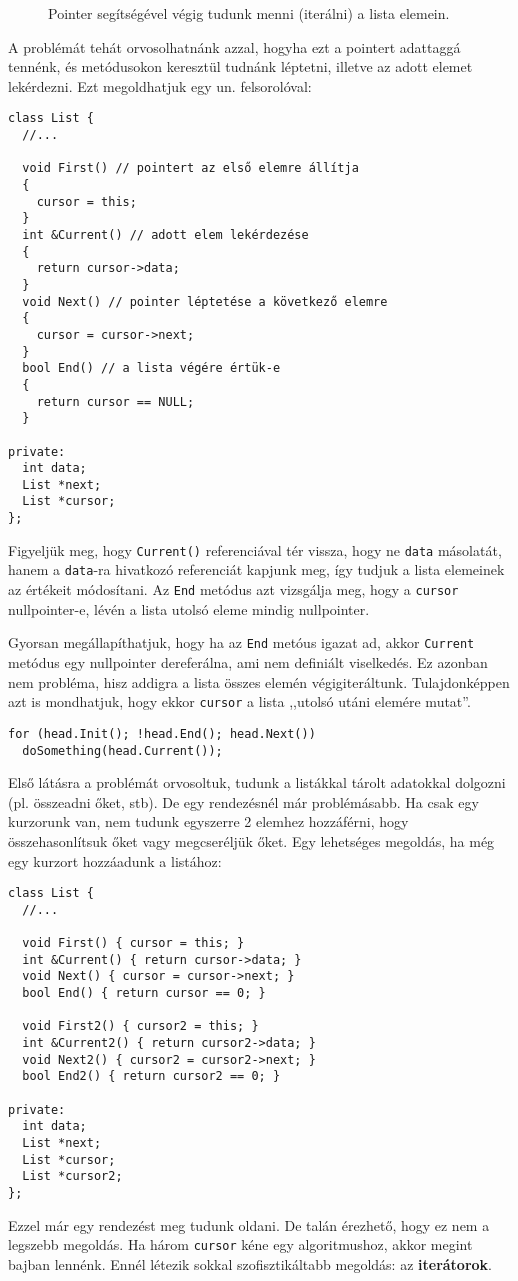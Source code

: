 \documentclass[../cpp_book/cpp_book.tex]{subfiles}
\begin{document}
	\begin{figure}[h]
		\centering
		
		
		\caption{Pointer segítségével végig tudunk menni (iterálni) a lista elemein.}
	\end{figure}
	A problémát tehát orvosolhatnánk azzal, hogyha ezt a pointert adattaggá tennénk, és metódusokon keresztül tudnánk léptetni, illetve az adott elemet lekérdezni. Ezt megoldhatjuk egy un. felsorolóval:
\begin{lstlisting}
class List {
  //...

  void First() // pointert az első elemre állítja
  {
    cursor = this;
  }
  int &Current() // adott elem lekérdezése
  {
    return cursor->data;
  }
  void Next() // pointer léptetése a következő elemre
  {
    cursor = cursor->next;
  }
  bool End() // a lista végére értük-e
  {
    return cursor == NULL;
  }

private:
  int data;
  List *next;
  List *cursor;
};
\end{lstlisting}
	Figyeljük meg, hogy \texttt{Current()} referenciával tér vissza, hogy ne \texttt{data} másolatát, hanem a \texttt{data}-ra hivatkozó referenciát kapjunk meg, így tudjuk a lista elemeinek az értékeit módosítani. Az \texttt{End} metódus azt vizsgálja meg, hogy a \texttt{cursor} nullpointer-e, lévén a lista utolsó eleme mindig nullpointer.
	\begin{note}
		Gyorsan megállapíthatjuk, hogy ha az \texttt{End} metóus igazat ad, akkor \texttt{Current} metódus egy nullpointer dereferálna, ami nem definiált viselkedés. Ez azonban nem probléma, hisz addigra a lista összes elemén végigiteráltunk. Tulajdonképpen azt is mondhatjuk, hogy ekkor \texttt{cursor} a lista ,,utolsó utáni elemére mutat''. 
	\end{note}
\begin{lstlisting}
for (head.Init(); !head.End(); head.Next())
  doSomething(head.Current());
\end{lstlisting}
	Első látásra a problémát orvosoltuk, tudunk a listákkal tárolt adatokkal dolgozni (pl. összeadni őket, stb). De egy rendezésnél már problémásabb. Ha csak egy kurzorunk van, nem tudunk egyszerre 2 elemhez hozzáférni, hogy összehasonlítsuk őket vagy megcseréljük őket. Egy lehetséges megoldás, ha még egy kurzort hozzáadunk a listához:
\begin{lstlisting}
class List {
  //...

  void First() { cursor = this; }
  int &Current() { return cursor->data; }
  void Next() { cursor = cursor->next; }
  bool End() { return cursor == 0; }

  void First2() { cursor2 = this; }
  int &Current2() { return cursor2->data; }
  void Next2() { cursor2 = cursor2->next; }
  bool End2() { return cursor2 == 0; }

private:
  int data;
  List *next;
  List *cursor;
  List *cursor2;
};
\end{lstlisting}
	Ezzel már egy rendezést meg tudunk oldani. De talán érezhető, hogy ez nem a legszebb megoldás. Ha három \texttt{cursor} kéne egy algoritmushoz, akkor megint bajban lennénk. Ennél létezik sokkal szofisztikáltabb megoldás: az \textbf{iterátorok}.
	
\end{document}
